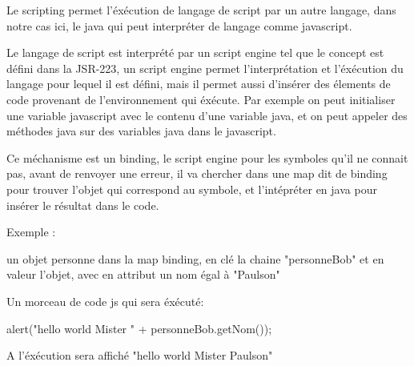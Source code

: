 Le scripting permet l'éxécution de langage de script par un autre langage, dans
notre cas ici, le java qui peut interpréter de langage comme javascript.

Le langage de script est interprété par un script engine tel que le concept est 
défini dans la JSR-223, un script engine permet l'interprétation et l'éxécution
du langage pour lequel il est défini, mais il permet aussi d'insérer des élements
de code provenant de l'environnement qui éxécute. Par exemple on peut initialiser
une variable javascript avec le contenu d'une variable java, et on peut appeler 
des méthodes java sur des variables java dans le javascript.

Ce méchanisme est un binding, le script engine pour les symboles qu'il ne connait
pas, avant de renvoyer une erreur, il va chercher dans une map dit de binding 
pour trouver l'objet qui correspond au symbole, et l'intépréter en java pour
insérer le résultat dans le code.

Exemple :

un objet personne dans la map binding, en clé la chaine "personneBob" et en valeur 
l'objet, avec en attribut un nom égal à "Paulson"

Un morceau de code js qui sera éxécuté:

alert("hello world Mister " + personneBob.getNom());

A l'éxécution sera affiché "hello world Mister Paulson"






